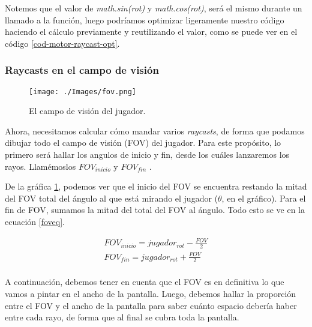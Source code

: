 

Notemos que el valor de \emph{math.sin(rot)} y \emph{math.cos(rot)}, será el mismo durante un llamado a la función, luego podríamos optimizar ligeramente nuestro código haciendo el cálculo previamente y reutilizando el valor, como se puede ver en el código \ref{cod-motor-raycast-opt}.

\newpage




\newpage

\subsubsection{Raycasts en el campo de visión}

\begin{figure}[h!]
	\centering
	\texttt{[image: ./Images/fov.png]}
	\caption{El campo de visión del jugador.}
	\label{fovgraph}
\end{figure}

Ahora, necesitamos calcular cómo mandar varios \emph{raycasts}, de forma que podamos dibujar todo el campo de visión (FOV) del jugador. Para este propósito, lo primero será hallar los angulos de inicio y fin, desde los cuáles lanzaremos los rayos. Llamémoslos $FOV_{inicio}$ y $FOV_{fin}$ .

De la gráfica \ref{fovgraph}, podemos ver que el inicio del FOV se encuentra restando la mitad del FOV total del ángulo al que está mirando el jugador ($\theta$, en el gráfico). Para el fin de FOV, sumamos la mitad del total del FOV al ángulo. Todo esto se ve en la ecuación \ref{foveq}. 

\begin{equation}
\begin{aligned}
\label{foveq}
FOV_{inicio} = jugador_{rot} - \frac{FOV}{2}\\
FOV_{fin} = jugador_{rot} + \frac{FOV}{2} \\
\end{aligned}
\end{equation}

A continuación, debemos tener en cuenta que el FOV es en definitiva lo que vamos a pintar en el ancho de la pantalla. Luego, debemos hallar la proporción entre el FOV y el ancho de la pantalla para saber cuánto espacio debería haber entre cada rayo, de forma que al final se cubra toda la pantalla.

